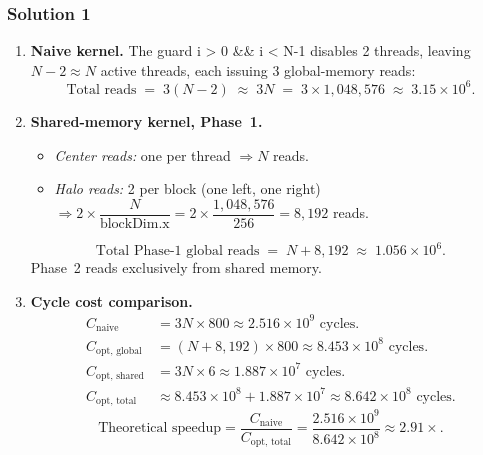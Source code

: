 \subsubsection{Solution 1}
\begin{enumerate}[label=(\alph*)]
  \item \textbf{Naive kernel.}  The guard {i > 0 \&\& i < N-1}
        disables 2 threads, leaving $N - 2 \approx N$ active threads, each
        issuing 3 global-memory reads:
        \[
          \text{Total reads} \;=\; 3(N-2) \;\approx\; 3N
          \;=\; 3 \times 1{,}048{,}576 \;\approx\; 3.15 \times 10^{6}.
        \]

  \item \textbf{Shared-memory kernel, Phase~1.}
        \begin{itemize}
          \item \emph{Center reads:} one per thread $\Rightarrow N$ reads.
          \item \emph{Halo reads:} 2 per block (one left, one right)
                $\Rightarrow 2 \times \dfrac{N}{\text{blockDim.x}}
                = 2 \times \dfrac{1{,}048{,}576}{256} = 8{,}192$ reads.
        \end{itemize}
        \[
          \text{Total Phase-1 global reads}
          \;=\; N + 8{,}192 \;\approx\; 1.056 \times 10^{6}.
        \]
        Phase~2 reads exclusively from shared memory.

  \item \textbf{Cycle cost comparison.}
        \begin{align*}
          C_{\text{naive}}
            &= 3N \times 800
             \approx 2.516 \times 10^{9} \text{ cycles.}\\[4pt]
          C_{\text{opt, global}}
            &= (N + 8{,}192) \times 800
             \approx 8.453 \times 10^{8} \text{ cycles.}\\
          C_{\text{opt, shared}}
            &= 3N \times 6
             \approx 1.887 \times 10^{7} \text{ cycles.}\\[2pt]
          C_{\text{opt, total}}
            &\approx 8.453 \times 10^{8} + 1.887 \times 10^{7}
             \approx 8.642 \times 10^{8} \text{ cycles.}
        \end{align*}
        \[
          \boxed{\text{Theoretical speedup}
          = \frac{C_{\text{naive}}}{C_{\text{opt, total}}}
          = \frac{2.516 \times 10^{9}}{8.642 \times 10^{8}}
          \approx 2.91\times.}
        \]


\end{enumerate}
